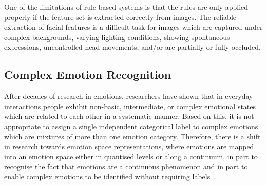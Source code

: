 \documentclass[10pt,journal,cspaper,compsoc]{IEEEtran}
\begin{document}
One of the limitations of rule-based systems is that the rules are only applied properly if the feature set is extracted correctly from images. The reliable extraction of facial features is a difficult task for images which are captured under complex backgrounds, varying lighting conditions, showing spontaneous expressions, uncontrolled head movements, and/or are partially or fully occluded.

\subsection{Complex Emotion Recognition}
\label{sec_complex_emo_rec}
After decades of research in emotions, researchers have shown that in everyday interactions people exhibit non-basic, intermediate, or complex emotional states which are related to each other in a systematic manner. Based on this, it is not appropriate to assign a single independent categorical label to complex emotions which are mixtures of more than one emotion category. Therefore, there is a shift in research towards emotion space representations, where emotions are mapped into an emotion space either in quantised levels or along a continuum, in part to recognise the fact that emotions are a continuous phenomenon and in part to enable complex emotions to be identified without requiring labels~\cite{gunes2011continuous}.
\end{document}
